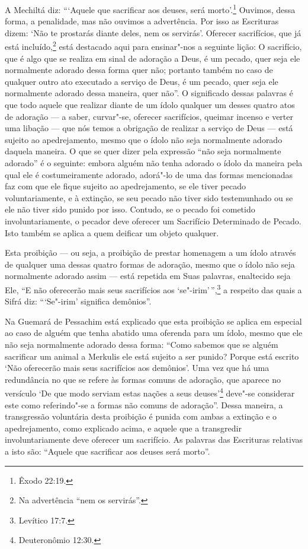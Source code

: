 \begin{multicols}{2}
A Mechiltá\starr{} diz: ```Aquele que sacrificar aos deuses, será morto'.\footnote{Êxodo
22:19.} Ouvimos, dessa forma, a penalidade, mas não ouvimos a
advertência. Por isso as Escrituras dizem: `Não te prostarás diante
deles, nem os servirás'.
Oferecer sacrifícios, que já está incluído,\footnote{Na advertência ``nem os servirás''.} está
destacado aqui para ensinar"-nos a seguinte lição: O sacrifício, que é
algo que se realiza em sinal de adoração a Deus, é um pecado, quer seja
ele normalmente adorado dessa forma quer não; portanto também no caso de
qualquer outro ato executado a serviço de Deus, é um pecado, quer seja
ele normalmente adorado dessa maneira, quer não''. O significado dessas
palavras é que todo aquele que realizar diante de um ídolo qualquer um
desses quatro atos de adoração --- a saber, curvar"-se, oferecer
sacrifícios, queimar incenso e verter uma libação --- que nós temos a
obrigação de realizar a serviço de Deus --- está sujeito ao
apedrejamento, mesmo que o ídolo não seja normalmente adorado daquela
maneira. O que se quer dizer pela expressão ``não seja normalmente
adorado'' é o seguinte: embora alguém não tenha adorado o ídolo da
maneira pela qual ele é costumeiramente adorado, adorá"-lo de uma das
formas mencionadas faz com que ele fique sujeito ao apedrejamento, se
ele tiver pecado voluntariamente, e à extinção, se seu pecado não tiver
sido testemunhado ou se ele não tiver sido punido por isso. Contudo, se
o pecado foi cometido involuntariamente, o pecador deve oferecer um
Sacrifício Determinado de Pecado. Isto também se aplica a quem deificar
um objeto qualquer.

Esta proibição --- ou seja, a proibição de prestar homenagem a um ídolo
através de qualquer uma dessas quatro formas de adoração, mesmo que o
ídolo não seja normalmente adorado assim --- está repetida em Suas
palavras, enaltecido seja Ele, ``E não oferecerão mais seus sacrifícios
aos `se"-irim'\,'',\footnote{Levítico 17:7.} a respeito das quais a Sifrá\starr{} diz:
```Se"-irim' significa demônios''.

Na Guemará\starr{} de Pessachim\starr{} está explicado que esta proibição se aplica em
especial ao caso de alguém que tenha abatido uma oferenda para um ídolo,
mesmo que ele não seja normalmente adorado dessa forma: ``Como sabemos
que se alguém sacrificar um animal a Merkulis\starr{} ele está sujeito a ser
punido? Porque está escrito `Não oferecerão mais seus sacrifícios aos
demônios'. Uma vez que há uma redundância no que se refere às formas
comuns de adoração, que aparece no versículo `De que modo serviam estas
nações a seus deuses'\footnote{Deuteronômio 12:30.} deve"-se considerar este como
referindo"-se a formas não comuns de adoração''. Dessa maneira, a
transgressão voluntária desta proibição é punida com ambas a extinção e
o apedrejamento, como explicado acima, e aquele que a transgredir
involuntariamente deve oferecer um sacrifício. As palavras das
Escrituras relativas a isto são: ``Aquele que sacrificar aos deuses será
morto''.


\end{multicols}
